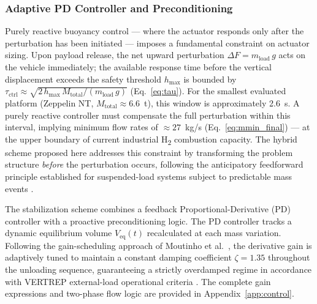 \documentclass[applsci,article,submit,pdftex,moreauthors]{Definitions/mdpi}
\begin{document}
\subsubsection{Adaptive PD Controller and Preconditioning}
Purely reactive buoyancy control --- where the actuator responds only after the perturbation has been initiated --- imposes a fundamental constraint on actuator sizing. Upon payload release, the net upward perturbation $\Delta F = m_\text{load}\,g$ acts on the vehicle immediately; the available response time before the vertical displacement exceeds the safety threshold $h_\text{max}$ is bounded by $\tau_\text{ctrl} \approx \sqrt{2\,h_\text{max}\,M_\text{total}/(m_\text{load}\,g)}$ (Eq.~\eqref{eq:tau}). For the smallest evaluated platform (Zeppelin NT, $M_\text{total} \approx 6.6$~t), this window is approximately 2.6~s. A purely reactive controller must compensate the full perturbation within this interval, implying minimum flow rates of ${\approx}27$~kg/s (Eq.~\eqref{eq:mmin_final}) --- at the upper boundary of current industrial H\textsubscript{2} combustion capacity. The hybrid scheme proposed here addresses this constraint by transforming the problem structure \emph{before} the perturbation occurs, following the anticipatory feedforward principle established for suspended-load systems subject to predictable mass events \cite{Kowsari2024}.

The stabilization scheme combines a feedback Proportional-Derivative (PD) controller with a proactive preconditioning logic. The PD controller tracks a dynamic equilibrium volume $V_\text{eq}(t)$ recalculated at each mass variation. Following the gain-scheduling approach of Moutinho et al.\ \cite{Azinheira2016}, the derivative gain is adaptively tuned to maintain a constant damping coefficient $\zeta = 1.35$ throughout the unloading sequence, guaranteeing a strictly overdamped regime in accordance with VERTREP external-load operational criteria \cite{ref7, ref8}. The complete gain expressions and two-phase flow logic are provided in Appendix~\ref{app:control}.
\end{document}
